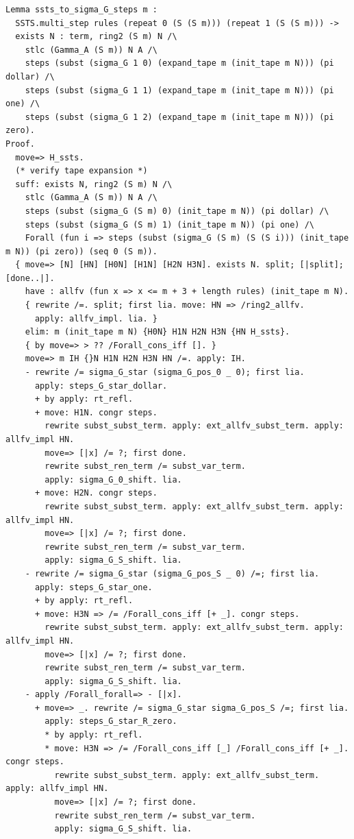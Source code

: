 \begin{lstlisting}
Lemma ssts_to_sigma_G_steps m :
  SSTS.multi_step rules (repeat 0 (S (S m))) (repeat 1 (S (S m))) ->
  exists N : term, ring2 (S m) N /\
    stlc (Gamma_A (S m)) N A /\
    steps (subst (sigma_G 1 0) (expand_tape m (init_tape m N))) (pi dollar) /\
    steps (subst (sigma_G 1 1) (expand_tape m (init_tape m N))) (pi one) /\
    steps (subst (sigma_G 1 2) (expand_tape m (init_tape m N))) (pi zero).
Proof.
  move=> H_ssts.
  (* verify tape expansion *)
  suff: exists N, ring2 (S m) N /\
    stlc (Gamma_A (S m)) N A /\
    steps (subst (sigma_G (S m) 0) (init_tape m N)) (pi dollar) /\
    steps (subst (sigma_G (S m) 1) (init_tape m N)) (pi one) /\
    Forall (fun i => steps (subst (sigma_G (S m) (S (S i))) (init_tape m N)) (pi zero)) (seq 0 (S m)).
  { move=> [N] [HN] [H0N] [H1N] [H2N H3N]. exists N. split; [|split]; [done..|].
    have : allfv (fun x => x <= m + 3 + length rules) (init_tape m N).
    { rewrite /=. split; first lia. move: HN => /ring2_allfv.
      apply: allfv_impl. lia. }
    elim: m (init_tape m N) {H0N} H1N H2N H3N {HN H_ssts}.
    { by move=> > ?? /Forall_cons_iff []. }
    move=> m IH {}N H1N H2N H3N HN /=. apply: IH.
    - rewrite /= sigma_G_star (sigma_G_pos_0 _ 0); first lia.
      apply: steps_G_star_dollar.
      + by apply: rt_refl.
      + move: H1N. congr steps.
        rewrite subst_subst_term. apply: ext_allfv_subst_term. apply: allfv_impl HN.
        move=> [|x] /= ?; first done.
        rewrite subst_ren_term /= subst_var_term.
        apply: sigma_G_0_shift. lia.
      + move: H2N. congr steps.
        rewrite subst_subst_term. apply: ext_allfv_subst_term. apply: allfv_impl HN.
        move=> [|x] /= ?; first done.
        rewrite subst_ren_term /= subst_var_term.
        apply: sigma_G_S_shift. lia.
    - rewrite /= sigma_G_star (sigma_G_pos_S _ 0) /=; first lia.
      apply: steps_G_star_one.
      + by apply: rt_refl.
      + move: H3N => /= /Forall_cons_iff [+ _]. congr steps.
        rewrite subst_subst_term. apply: ext_allfv_subst_term. apply: allfv_impl HN.
        move=> [|x] /= ?; first done.
        rewrite subst_ren_term /= subst_var_term.
        apply: sigma_G_S_shift. lia.
    - apply /Forall_forall=> - [|x].
      + move=> _. rewrite /= sigma_G_star sigma_G_pos_S /=; first lia.
        apply: steps_G_star_R_zero.
        * by apply: rt_refl.
        * move: H3N => /= /Forall_cons_iff [_] /Forall_cons_iff [+ _]. congr steps.
          rewrite subst_subst_term. apply: ext_allfv_subst_term. apply: allfv_impl HN.
          move=> [|x] /= ?; first done.
          rewrite subst_ren_term /= subst_var_term.
          apply: sigma_G_S_shift. lia.

\end{lstlisting}
